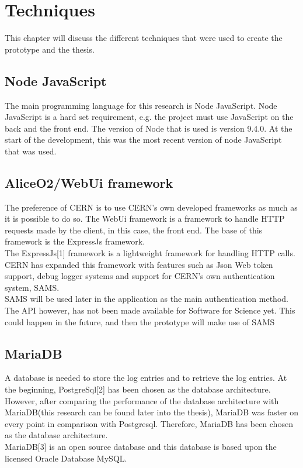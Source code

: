 \documentclass[paper=a4, fontsize=11pt,twoside]{scrartcl}	%
\begin{document}
 

\newpage
\section{Techniques}
This chapter will discuss the different techniques that were used to create the prototype and the thesis. 

\subsection{ Node JavaScript}
The main programming language for this research is Node JavaScript. Node JavaScript is a hard set requirement, e.g. the project must use JavaScript on the back and the front end. The version of Node that is used is version 9.4.0. At the start of the development, this was the most recent version of node JavaScript that was used.

\subsection{AliceO2/WebUi framework}
The preference of CERN is to use CERN's own developed frameworks as much as it is possible to do so. The WebUi framework is a framework to handle HTTP requests made by the client, in this case, the front end. The base of this framework is the ExpressJs framework. \\
The ExpressJs[1] framework is a lightweight framework for handling HTTP calls. CERN has expanded this framework with features such as Json Web token support, debug logger systems and support for CERN's own authentication system, SAMS. \\
SAMS will be used later in the application as the main authentication method. The API however, has not been made available for Software for Science yet. This could happen in the future, and then the prototype will make use of SAMS

\subsection{MariaDB}
A database is needed to store the log entries and to retrieve the log entries. At the beginning, PostgreSql[2] has been chosen as the database architecture. However, after comparing the performance of the database architecture with MariaDB(this research can be found later into the thesis), MariaDB was faster on every point in comparison with Postgresql. Therefore, MariaDB has been chosen as the database architecture. \\
MariaDB[3] is an open source database and this database is based upon the licensed Oracle Database MySQL. 
\end{document}
